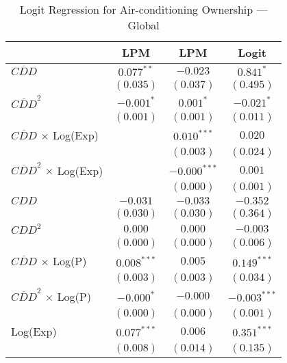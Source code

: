 
\begin{table}[H]
\caption{Logit Regression for Air-conditioning Ownership --- Global}
\begin{center}
\begin{tabular}{l c c c}
\hline
 & LPM & LPM & Logit \\
\hline
$\overline{CDD}$                     & $0.077^{**}$   & $-0.023$       & $0.841^{*}$      \\
                                     & $(0.035)$      & $(0.037)$      & $(0.495)$        \\
$\overline{CDD}^2$                   & $-0.001^{*}$   & $0.001^{*}$    & $-0.021^{*}$     \\
                                     & $(0.001)$      & $(0.001)$      & $(0.011)$        \\
$\overline{CDD}$ $\times$ Log(Exp)   &                & $0.010^{***}$  & $0.020$          \\
                                     &                & $(0.003)$      & $(0.024)$        \\
$\overline{CDD}^2$ $\times$ Log(Exp) &                & $-0.000^{***}$ & $0.001$          \\
                                     &                & $(0.000)$      & $(0.001)$        \\
$CDD$                                & $-0.031$       & $-0.033$       & $-0.352$         \\
                                     & $(0.030)$      & $(0.030)$      & $(0.364)$        \\
$CDD^2$                              & $0.000$        & $0.000$        & $-0.003$         \\
                                     & $(0.000)$      & $(0.000)$      & $(0.006)$        \\
$\overline{CDD}$ $\times$ Log(P)     & $0.008^{***}$  & $0.005$        & $0.149^{***}$    \\
                                     & $(0.003)$      & $(0.003)$      & $(0.034)$        \\
$\overline{CDD}^2$ $\times$ Log(P)   & $-0.000^{*}$   & $-0.000$       & $-0.003^{***}$   \\
                                     & $(0.000)$      & $(0.000)$      & $(0.001)$        \\
Log(Exp)                             & $0.077^{***}$  & $0.006$        & $0.351^{***}$    \\
                                     & $(0.008)$      & $(0.014)$      & $(0.135)$        \\

\end{tabular}
\end{center}
\end{table}
